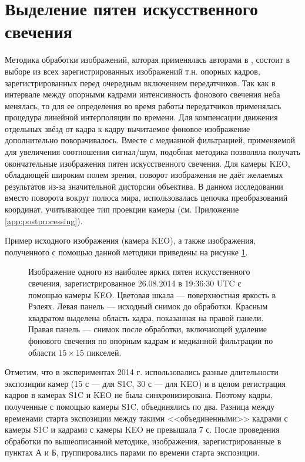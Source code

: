 \documentclass[12pt,a4paper]{article}
\begin{document}
\section{Выделение пятен искусственного свечения} \label{sec:glow}
Методика обработки изображений, которая применялась авторами в \cite{Grach2012}, состоит в выборе из всех зарегистрированных изображений т.н. опорных кадров, зарегистрированных перед очередным включением передатчиков. 
Так как в интервале между опорными кадрами интенсивность фонового свечения неба менялась, то для ее определения во время работы передатчиков применялась процедура линейной интерполяции по времени. Для компенсации движения отдельных звёзд от кадра к кадру вычитаемое фоновое изображение дополнительно поворачивалось. 
Вместе с медианной фильтрацией, применяемой для увеличения соотношения сигнал/шум, подобная методика позволяла получать окончательные изображения пятен искусственного свечения. Для камеры KEO, обладающей широким полем зрения, поворот изображения не даёт желаемых результатов из-за значительной дисторсии объектива. В данном исследовании вместо поворота вокруг полюса мира, использовалась цепочка преобразований координат, учитывающее тип проекции камеры (см. Приложение \ref{app:postprocessing}). 

Пример исходного изображения (камера KEO), а также изображения, полученного с помощью данной методики приведены на рисунке \ref{fig:fig5}.
\begin{figure}[h]
	\caption{Изображение одного из наиболее ярких пятен искусственного свечения, зарегистрированное 26.08.2014 в 19:36:30 UTC	с помощью камеры KEO. Цветовая шкала --- поверхностная яркость в Рэлеях. Левая панель --- исходный снимок до обработки. Красным квадратом выделена область кадра, показанная на правой панели. Правая панель --- снимок после обработки, включающей удаление фонового свечения по опорным кадрам и медианной фильтрации по области $15 \times 15$ пикселей.}
	\label{fig:fig5}
\end{figure}
Отметим, что в экспериментах 2014 г. использовались разные длительности экспозиции камер (15 с --- для S1C, 30 с --- для KEO) и в целом регистрация кадров в камерах S1C и KEO не была синхронизирована. Поэтому кадры, полученные с помощью камеры S1C, объединялись по два. Разница между временами старта экспозиции между такими <<объединенными>> кадрами с камеры S1C и кадрами с камеры KEO не превышала 7 с. После проведения обработки по вышеописанной методике, изображения, зарегистрированные в пунктах А и Б, группировались парами по времени старта экспозиции.
\end{document}
